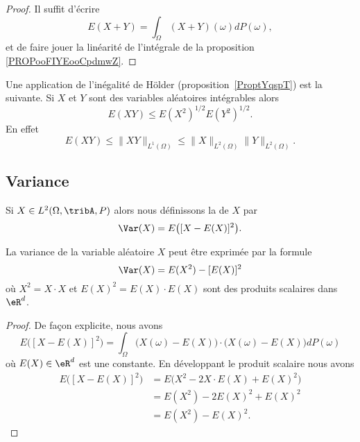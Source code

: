 \begin{proof}
	Il suffit d'écrire
	\begin{equation}
		E(X+Y)=\int_{\Omega}(X+Y)(\omega)dP(\omega),
	\end{equation}
	et de faire jouer la linéarité de l'intégrale de la proposition \ref{PROPooFIYEooCpdmwZ}.
\end{proof}

Une application de l'inégalité de Hölder (proposition~\ref{ProptYqspT}) est la suivante. Si \( X\) et \( Y\) sont des variables aléatoires intégrables alors
\begin{equation}
	E(XY)\leq E(X^2)^{1/2}E(Y^2)^{1/2}.
\end{equation}
En effet
\begin{equation}    \label{EqEXYleqXdYdNormHolder}
	E(XY)\leq \| XY \|_{L^1(\Omega)}\leq \| X \|_{L^2(\Omega)}\| Y \|_{L^2(\Omega)}.
\end{equation}

\subsection{Variance}

Si \( X\in L^2(\Omega,\tribA,P)\) alors nous définissons la  de \( X\) par
\begin{equation}
	\Var(X)=E\big( [X-E(X)]^2 \big).
\end{equation}

\begin{proposition}     \label{PrropVarAlterfrom}
	La variance de la variable aléatoire \( X\) peut être exprimée par la formule
	\begin{equation}        \label{EqtWqMGB}
		\Var(X)=E(X^2)-[E(X)]^2
	\end{equation}
	où \( X^2=X\cdot X\) et \( E(X)^2=E(X)\cdot E(X)\) sont des produits scalaires dans \( \eR^d\).
\end{proposition}

\begin{proof}
	De façon explicite, nous avons
	\begin{equation}
		E\big( [X-E(X)]^2 \big)=\int_{\Omega}\big( X(\omega)-E(X) \big)\cdot\big( X(\omega)-E(X) \big)dP(\omega)
	\end{equation}
	où \( E(X)\in\eR^d\) est une constante. En développant le produit scalaire nous avons
	\begin{subequations}
		\begin{align}
			E\big( [X-E(X)]^2 \big) & =E\big( X^2-2X\cdot E(X)+E(X)^2 \big) \\
			                        & =E(X^2)-2E(X)^2+E(X)^2                \\
			                        & =E(X^2)-E(X)^2.
		\end{align}
	\end{subequations}
\end{proof}

